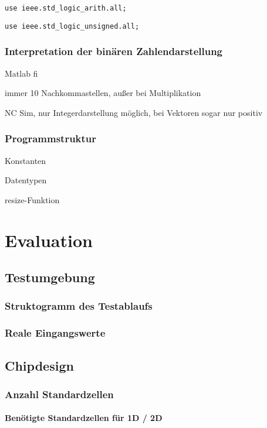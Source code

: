 \texttt{use ieee.std\_logic\_arith.all;}

\texttt{use ieee.std\_logic\_unsigned.all;}
 
 \subsection{Interpretation der binären Zahlendarstellung}
 Matlab fi
 
 immer 10 Nachkommastellen, außer bei Multiplikation
 
 NC Sim, nur Integerdarstellung möglich, bei Vektoren sogar nur positiv
 
 
 \subsection{Programmstruktur}
 
 Konstanten
 
 Datentypen
 
 resize-Funktion
 
 
  
 
 
 
  
 \chapter{Evaluation}
 


 \section{Testumgebung}
 \subsection{Struktogramm des Testablaufs}
 \subsection{Reale Eingangswerte}
 
 \section{Chipdesign}
 \subsection{Anzahl Standardzellen}
 \subsubsection{Benötigte Standardzellen für 1D / 2D}
